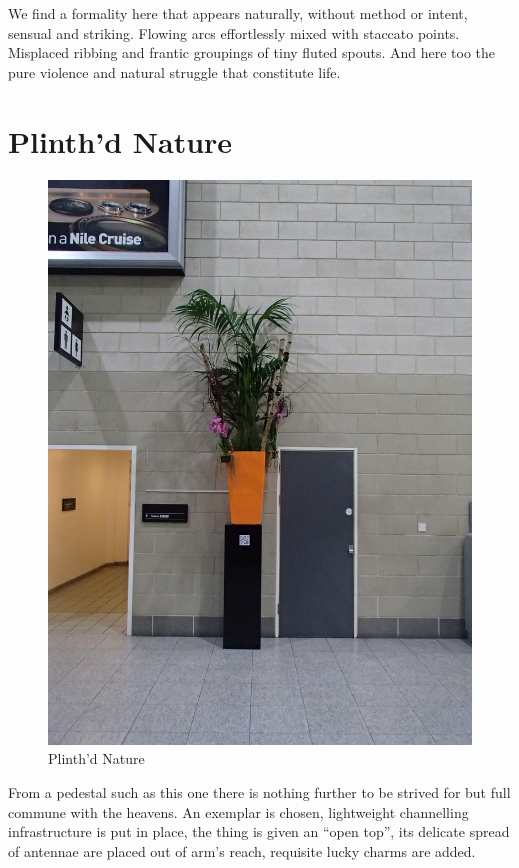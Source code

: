 \documentclass{article}
\begin{document}
We find a formality here that appears naturally, without method or intent,
sensual and striking. Flowing arcs effortlessly mixed with staccato points.
Misplaced ribbing and frantic groupings of tiny fluted spouts. And here too
the pure violence and natural struggle that constitute life.

\chapter{Plinth'd Nature}

\begin{figure}
\centering
\includegraphics[width=\textwidth,angle=90]{figures/P1050143.JPG}
\caption{Plinth'd Nature}
\end{figure}

From a pedestal such as this one there is nothing further to be strived for but
full commune with the heavens. An exemplar is chosen, lightweight channelling
infrastructure is put in place, the thing is given an ``open top'', its
delicate spread of antennae are placed out of arm's reach, requisite lucky
charms are added.
\end{document}
